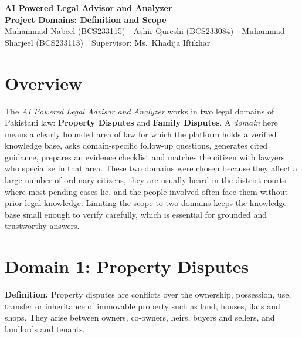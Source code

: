 \documentclass[11pt,a4paper]{article}
\begin{document}
\begin{center}
{\Large\bfseries\color{headteal} AI Powered Legal Advisor and Analyzer}\\[3pt]
{\large\bfseries Project Domains: Definition and Scope}\\[2pt]
{\small Muhammad Nabeel (BCS233115) \,\textperiodcentered\, Ashir Qureshi (BCS233084) \,\textperiodcentered\, Muhammad Sharjeel (BCS233113) \,\textperiodcentered\, Supervisor: Ms.\ Khadija Iftikhar}
\end{center}

\section{Overview}
The \emph{AI Powered Legal Advisor and Analyzer} works in two legal domains of Pakistani law: \textbf{Property Disputes} and \textbf{Family Disputes}. A \emph{domain} here means a clearly bounded area of law for which the platform holds a verified knowledge base, asks domain-specific follow-up questions, generates cited guidance, prepares an evidence checklist and matches the citizen with lawyers who specialise in that area. These two domains were chosen because they affect a large number of ordinary citizens, they are usually heard in the district courts where most pending cases lie, and the people involved often face them without prior legal knowledge. Limiting the scope to two domains keeps the knowledge base small enough to verify carefully, which is essential for grounded and trustworthy answers.

\section{Domain 1: Property Disputes}
\textbf{Definition.} Property disputes are conflicts over the ownership, possession, use, transfer or inheritance of immovable property such as land, houses, flats and shops. They arise between owners, co-owners, heirs, buyers and sellers, and landlords and tenants.
\end{document}

